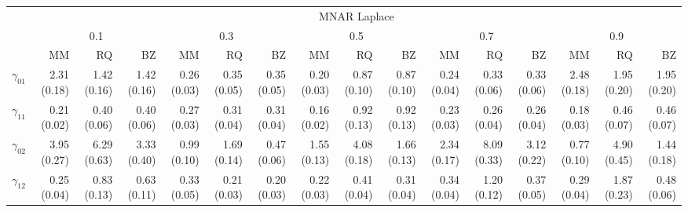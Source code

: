 \documentclass[12pt]{article}
\begin{document}
\begin{landscape}
\begin{table}[h]
  \begin{tabular}{rrrrrrrrrrrrrrrr}
    \toprule
    & \multicolumn{15}{c}{MNAR Laplace} \\
    \cline{2-16}
    &  \multicolumn{3}{c}{0.1} &  \multicolumn{3}{c}{0.3} &  \multicolumn{3}{c}{0.5} &
    \multicolumn{3}{c}{0.7} &  \multicolumn{3}{c}{0.9} \\
    \cline{2-16}
    & MM   & RQ   & BZ   & MM   & RQ   & BZ   & MM   & RQ   & BZ   & MM   & RQ   & BZ   & MM   & RQ   & BZ   \\
    \hline
    $\gamma_{01}$ & 2.31 (0.18) & 1.42 (0.16) & 1.42 (0.16) & 0.26 (0.03) & 0.35 (0.05) & 0.35 (0.05) & 0.20 (0.03) & 0.87 (0.10) & 0.87 (0.10) & 0.24 (0.04) & 0.33 (0.06) & 0.33 (0.06) & 2.48 (0.18) & 1.95 (0.20) & 1.95 (0.20) \\
    $\gamma_{11}$ & 0.21 (0.02) & 0.40 (0.06) & 0.40 (0.06) & 0.27 (0.03) & 0.31 (0.04) & 0.31 (0.04) & 0.16 (0.02) & 0.92 (0.13) & 0.92 (0.13) & 0.23 (0.03) & 0.26 (0.04) & 0.26 (0.04) & 0.18 (0.03) & 0.46 (0.07) & 0.46 (0.07) \\
    $\gamma_{02}$ & 3.95 (0.27) & 6.29 (0.63) & 3.33 (0.40) & 0.99 (0.10) & 1.69 (0.14) & 0.47 (0.06) & 1.55 (0.13) & 4.08 (0.18) & 1.66 (0.13) & 2.34 (0.17) & 8.09 (0.33) & 3.12 (0.22) & 0.77 (0.10) & 4.90 (0.45) & 1.44 (0.18) \\
    $\gamma_{12}$ & 0.25 (0.04) & 0.83 (0.13) & 0.63 (0.11) & 0.33 (0.05) & 0.21 (0.03) & 0.20 (0.03) & 0.22 (0.03) & 0.41 (0.04) & 0.31 (0.04) & 0.34 (0.04) & 1.20 (0.12) & 0.37 (0.05) & 0.29 (0.04) & 1.87 (0.23) & 0.48 (0.06) \\
    \bottomrule
  \end{tabular}

\end{table}
\end{landscape}
\end{document}
